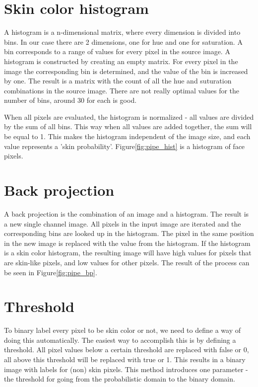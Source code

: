 \section{Skin color histogram}
A histogram is a n-dimensional matrix, where every dimension is divided into bins. In our case there are 2 dimensions, one for hue and one for saturation. A bin corresponds to a range of values for every pixel in the source image. A histogram is constructed by creating an empty matrix. For every pixel in the image the corresponding bin is determined, and the value of the bin is increased by one. The result is a matrix with the count of all the hue and suturation combinations in the source image. There are not really optimal values for the number of bins, around 30 for each is good.

When all pixels are evaluated, the histogram is normalized - all values are divided by the sum of all bins. This way when all values are added together, the sum will be equal to 1. This makes the histogram independent of the image size, and each value represents a 'skin probability'. Figure\ref{fig:pipe_hist} is a histogram of face pixels.

\section{Back projection}
A back projection is the combination of an image and a histogram. The result is a new single channel image. All pixels in the input image are iterated and the corresponding bins are looked up in the histogram. The pixel in the same position in the new image is replaced with the value from the histogram. If the histogram is a skin color histogram, the resulting image will have high values for pixels that are skin-like pixels, and low values for other pixels. The result of the process can be seen in Figure\ref{fig:pipe_bp}.


\section{Threshold}
To binary label every pixel to be skin color or not, we need to define a way of doing this automatically. The easiest way to accomplish this is by defining a threshold. All pixel values below a certain threshold are replaced with false or 0, all above this threshold will be replaced with true or 1. This results in a binary image with labels for (non) skin pixels. This method introduces one parameter - the threshold for going from the probabilistic domain to the binary domain.

